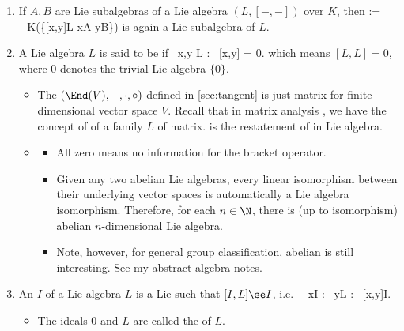 \documentclass{article}
\begin{document}
\begin{enumerate}
    \item {} If $A,B$ are Lie subalgebras of a Lie algebra $(L,[-,-])$ over $K$, then
\bse
[A,B] := \lspan_K\bigl(\{[x,y]\in L \mid x\in A  y\in B\}\bigr)
\ese
is again a Lie subalgebra of $L$.
\item {} A Lie algebra $L$ is said to be  if
\bse
\forall \, x,y \in L : \ [x,y] = 0.
\ese
which means $[L,L]=0$, where $0$ denotes the trivial Lie algebra $\{0\}$.
\begin{itemize}
    \item {} The $(\End(V),+,\cdot,\circ)$ defined in \cref{sec:tangent} is just matrix for finite dimensional vector space $V$. Recall that in matrix analysis \cite{horn2012matrix}, we have the concept of  of a family $L$ of matrix.  is the restatement of  in Lie algebra.
    \item {} 
    \begin{itemize}[$\ast$]
        \item All zero means no information for the bracket operator.
        \item Given any two abelian Lie algebras, every linear isomorphism between their underlying vector spaces is automatically a Lie algebra isomorphism. Therefore, for each $n\in \N$, there is (up to isomorphism)  abelian $n$-dimensional Lie algebra.
        \item Note, however, for general group classification, abelian is still interesting. See my abstract algebra notes.
    \end{itemize} 
\end{itemize}

\item {}  An  $I$ of a Lie algebra $L$ is a Lie  such that $[I,L]\se I$, i.e.\
\bse
\forall \, x\in I : \forall \, y\in L : \ [x,y]\in I.
\ese
\begin{itemize}
    \item {} The ideals $0$ and $L$ are called the  of $L$.
\end{itemize}


\end{enumerate}
\end{document}

